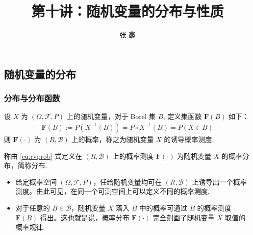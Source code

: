 

\subsection{随机变量的分布}
\title [概率论]{第十讲：随机变量的分布与性质}
\author [张鑫 {\rm Email: xzhangseu@seu.edu.cn} ]{\large 张 鑫}
\date{}

{ 
	\begin{frame}
		\titlepage
	\end{frame}
}

\addtocounter{framenumber}{-3}  %

\begin{frame}
	\frametitle{分布与分布函数}
	\begin{thm}
		设 $X$ 为 $(\Omega,\mathcal{F},P)$ 上的随机变量，对于 Borel 集 $B$, 定义集函数 $\mathbf{F}(B)$ 如下：
		\begin{eqnarray}\label{eq:rvprob}
			\mathbf{F}(B):=P(X^{-1}(B))=P\circ X^{-1}(B)=P(X\in B)
		\end{eqnarray}
		则 $\mathbf{F}(\cdot)$ 为 $(R,\mathcal{B})$ 上的概率，称之为随机变量 $X$ 的诱导概率测度.
	\end{thm}
	\vspace{0.2cm}
	\pause
	\begin{defi}
		称由 \eqref{eq:rvprob} 式定义在 $(R,\mathcal{B})$ 上的概率测度 $\mathbf{F}(\cdot)$ 为随机变量 $X$ 的概率分布，简称分布.
	\end{defi}
	\pause
	\vspace{0.2cm}
	\begin{itemize}[<+-|alert@+>]
		\item 给定概率空间 $(\Omega,\mathcal{F},P)$，任给随机变量均可在 $(R,\mathcal{B})$ 上诱导出一个概率测度。由此可见，在同一个可测空间上可以定义不同的概率测度.
		\item 对于任意的 $B\in \mathcal{B}$，随机变量 $X$ 落入 $B$ 中的概率可通过 $B$ 的概率测度 $\mathbf{F}(B)$ 得出。这也就是说，概率分布 $\mathbf{F}(\cdot)$ 完全刻画了随机变量 $X$ 取值的概率规律.
	\end{itemize}
\end{frame}


